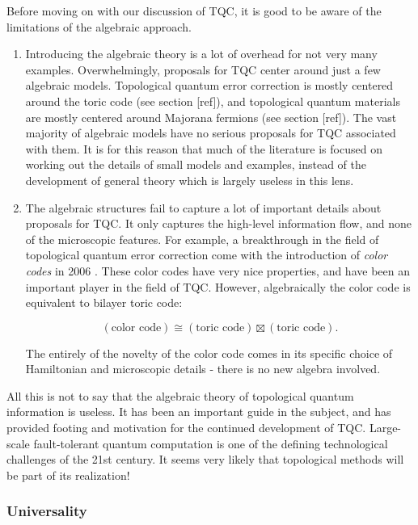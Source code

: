 \documentclass{article}
\theoremstyle{definition}
\newcommand{\0}{\left|0\right>}
\newcommand{\1}{\left|1\right>}
\numberwithin{figure}{section}
\begin{document}
Before moving on with our discussion of TQC, it is good to be aware of the limitations of the algebraic approach.

\begin{enumerate}
\item Introducing the algebraic theory is a lot of overhead for not very many examples. Overwhelmingly, proposals for TQC center around just a few algebraic models. Topological quantum error correction is mostly centered around the toric code (see section [ref]), and topological quantum materials are mostly centered around Majorana fermions (see section [ref]). The vast majority of algebraic models have no serious proposals for TQC associated with them. It is for this reason that much of the literature is focused on working out the details of small models and examples, instead of the development of general theory which is largely useless in this lens.

\item The algebraic structures fail to capture a lot of important details about proposals for TQC. It only captures the high-level information flow, and none of the microscopic features. For example, a breakthrough in the field of topological quantum error correction come with the introduction of \textit{color codes} in 2006 \cite{bombin2006topological}. These color codes have very nice properties, and have been an important player in the field of TQC. However, algebraically the color code is equivalent to bilayer toric code:

$$(\text{color code})\cong (\text{toric code})\boxtimes (\text{toric code}).$$

The entirely of the novelty of the color code comes in its specific choice of Hamiltonian and microscopic details - there is no new algebra involved.

\end{enumerate}

All this is not to say that the algebraic theory of topological quantum information is useless. It has been an important guide in the subject, and has provided footing and motivation for the continued development of TQC. Large-scale fault-tolerant quantum computation is one of the defining technological challenges of the 21st century. It seems very likely that topological methods will be part of its realization!

\subsubsection{Universality}
\end{document}
